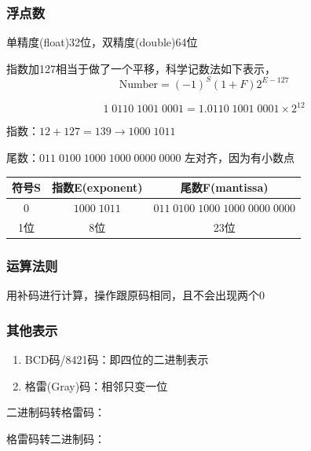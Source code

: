 \subsubsection{浮点数}
单精度(float)32位，双精度(double)64位
\par 指数加127相当于做了一个平移，科学记数法如下表示，
\[\text{Number}=(-1)^S(1+F)2^{E-127}\]
\begin{example}
\[1\;0110\;1001\;0001=1.0110\;1001\;0001\times 2^{12}\]
\par 指数：$12+127=139\to 1000\;1011$
\par 尾数：$011\;0100\;1000\;1000\;0000\;0000$ 左对齐，因为有小数点
\begin{center}
\begin{tabular}[htbp]{|c|c|c|}
\hline
符号S & 指数E(exponent) & 尾数F(mantissa)\\\hline
$0$ & $1000\;1011$ & $011\;0100\;1000\;1000\;0000\;0000$\\\hline
1位 & 8位 & 23位\\\hline
\end{tabular}
\end{center}
\end{example}
\subsubsection{运算法则}
用补码进行计算，操作跟原码相同，且不会出现两个0
\subsubsection{其他表示}
\begin{enumerate}
	\item BCD码/8421码：即四位的二进制表示
	\item 格雷(Gray)码：相邻只变一位
\end{enumerate}
\par 二进制码转格雷码：
\begin{center}
\end{center}
\par 格雷码转二进制码：
\begin{center}
\end{center}

